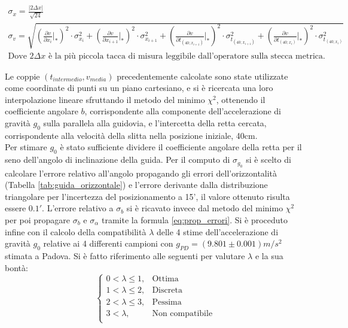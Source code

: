 \documentclass[a4paper,11pt,oneside]{article}
\begin{document}
\begin{gather*}
\sigma_{x}=\frac{\mathopen|2\Delta x\mathclose|}{\sqrt{24}} \\
\label{eq:propagazione_velocità}
    \sigma_{v}= \sqrt{
   \left( {\frac{\partial v}{\partial x_{i}}} \Big|_{\ast}\right)^{2} \cdot \sigma_{x_{i}}^2  +   
   \left( {\frac{\partial v}{\partial x_{i+1}}}\Big|_{\ast}\right )^{2} \cdot \sigma_{x_{i+1}}^2   +   
   \left( {\frac{\partial v}{\partial t_{\left(40; x_{i+1}\right)}}}\Big|_{\ast}\right)^{2}  \cdot \sigma_{t_{\left(40; x_{i+1}\right)}}^2 +   
       \left( {\frac{\partial v}{\partial t_{\left(40; x_i\right)}}}\Big|_{\ast}\right)^{2} \cdot  \sigma_{t_{\left(40; x_i\right)}}^2
    }\\
    \text{Dove $2\Delta x$ è la più piccola tacca di misura leggibile dall'operatore sulla stecca metrica.}
\end{gather*}

Le coppie $(t_{intermedio}, v_{media})$ precedentemente calcolate sono state utilizzate come coordinate di punti su un piano cartesiano, e si è ricercata una loro interpolazione lineare sfruttando il metodo del minimo ${\chi}^2$, ottenendo il coefficiente angolare $b$, corrispondente alla componente dell'accelerazione di gravità $g_{0}$ sulla parallela alla guidovia, e l'intercetta della retta cercata, corrispondente alla velocità della slitta nella posizione iniziale, 40cm.\\
Per stimare $g_{0}$ è stato sufficiente dividere il coefficiente angolare della retta per il seno dell'angolo di inclinazione della guida. Per il computo di $ \sigma_{g_{0}}$ si è scelto di calcolare l'errore relativo all'angolo propagando gli errori dell'orizzontalità (Tabella \ref{tab:guida_orizzontale}) e l'errore derivante dalla distribuzione triangolare per l'incertezza del posizionamento a 15', il valore ottenuto risulta essere $0.1'$. L'errore relativo a $\sigma_b$  si è ricavato invece dal metodo del minimo ${\chi}^2$ per poi propagare $\sigma_b$ e $\sigma_{\alpha}$ tramite la formula \ref{eq:prop_errori}. Si è proceduto infine con il calcolo della compatibilità $\lambda$ delle 4 stime dell'accelerazione di gravità $g_{0}$ relative ai 4 differenti campioni con $g_{PD}=(9.801\pm 0.001)\si{m/s^2}$ stimata a Padova. Si è fatto riferimento alle seguenti per valutare $\lambda$ e la sua bontà:
\begin{equation*}%
    \label{eq:cases}
    \begin{cases}
    0<\lambda\leq 1, & \text{Ottima}\\
    1<\lambda\leq2, & \text{Discreta}\\
    2<\lambda\leq3, & \text{Pessima}\\
    3<\lambda, & \text{Non compatibile}\\
    \end{cases}
\end{equation*}
\end{document}
